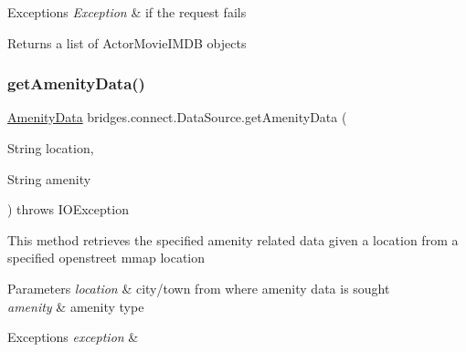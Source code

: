 \begin{DoxyExceptions}{Exceptions}
{\em Exception} & if the request fails\\
\hline
\end{DoxyExceptions}
\begin{DoxyReturn}{Returns}
a list of Actor\+Movie\+I\+M\+DB objects 
\end{DoxyReturn}
\mbox{\label{classbridges_1_1connect_1_1_data_source_aa25f4d7521aa1ad788b60816eb2088db}} 
\subsubsection{\texorpdfstring{get\+Amenity\+Data()}{getAmenityData()}\hspace{0.1cm}{\footnotesize\ttfamily [1/2]}}
{\footnotesize\ttfamily \hyperlink{classbridges_1_1data__src__dependent_1_1_amenity_data}{Amenity\+Data} bridges.\+connect.\+Data\+Source.\+get\+Amenity\+Data (\begin{DoxyParamCaption}\item[{String}]{location,  }\item[{String}]{amenity }\end{DoxyParamCaption}) throws I\+O\+Exception}

This method retrieves the specified amenity related data given a location from a specified openstreet mmap location


\begin{DoxyParams}{Parameters}
{\em location} & city/town from where amenity data is sought \\
\hline
{\em amenity} & amenity type \\
\hline
\end{DoxyParams}

\begin{DoxyExceptions}{Exceptions}
{\em exception} & \\
\hline
\end{DoxyExceptions}
\mbox{\label{classbridges_1_1connect_1_1_data_source_a4fdb7ddbeecaa30a4e6972c0b537bb44}} 
